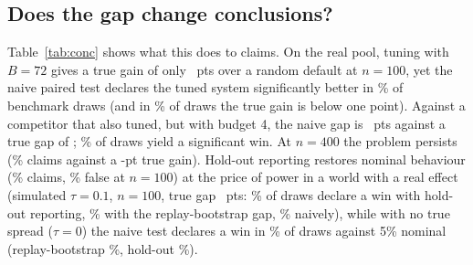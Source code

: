 \subsection{Does the gap change conclusions?}
\begin{table}[t]
\centering\small
\caption{\textbf{Decisions based on reported scores.} System A = random search with $B{=}72$ on $n$ questions. It is compared on the same questions with an untuned default (a random configuration) or with a lightly tuned system (RS, $B{=}4$) by a paired one-sided $z$-test at 5\%. \emph{Claims}: share of benchmark draws declaring $A$ significantly better; \emph{false claims}: such declarations when the true gap is below 1 pt. True gap = accuracy difference of the deployed configurations over the population. 300 draws per row (real) / 150 (simulated).}
\label{tab:conc}

\end{table}
Table~\ref{tab:conc} shows what this does to claims. On the real pool, tuning with $B{=}72$ gives a true gain of only \TrueGapDefNHund\ pts over a random default at $n{=}100$, yet the naive paired test declares the tuned system significantly better in \ClaimNaiveDefNHund\% of benchmark draws (and in \FalseClaimNaiveDefNHund\% of draws the true gain is below one point). Against a competitor that also tuned, but with budget 4, the naive gap is \NaiveGapFourNHund\ pts against a true gap of \TrueGapFourNHund; \ClaimNaiveFourNHund\% of draws yield a significant win. At $n{=}400$ the problem persists (\ClaimNaiveDefNFourH\% claims against a \TrueGapDefNFourH-pt true gain). Hold-out reporting restores nominal behaviour (\ClaimHoldDefNHund\% claims, \FalseClaimHoldDefNHund\% false at $n{=}100$) at the price of power in a world with a real effect (simulated $\tau{=}0.1$, $n{=}100$, true gap \SynTrueGapT\ pts: \SynClaimTHold\% of draws declare a win with hold-out reporting, \SynClaimTBoot\% with the replay-bootstrap gap, \SynClaimTNaive\% naively), while with no true spread ($\tau{=}0$) the naive test declares a win in \SynClaimZNaive\% of draws against 5\% nominal (replay-bootstrap \SynClaimZBoot\%, hold-out \SynClaimZHold\%).

